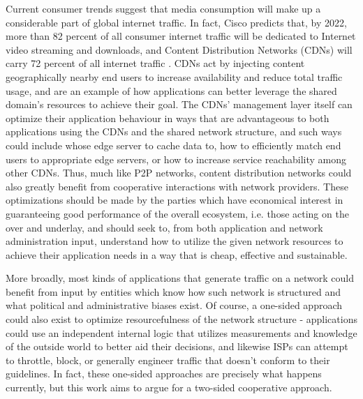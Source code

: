     Current consumer trends suggest that media consumption will make up a considerable part of global internet traffic.
    In fact, Cisco predicts that, by 2022, more than 82 percent of all consumer internet traffic will be dedicated to Internet video streaming and downloads, and Content Distribution Networks (CDNs) will carry 72 percent of all internet traffic \cite{cisco2019} .
    CDNs act by injecting content geographically nearby end users to increase availability and reduce total traffic usage, and are an example of how applications can better leverage the shared domain's resources to achieve their goal.
    The CDNs' management layer itself can optimize their application behaviour in ways that are advantageous to both applications using the CDNs and the shared network structure, and such ways could include whose edge server to cache data to, how to efficiently match end users to appropriate edge servers, or how to increase service reachability among other CDNs.
    Thus, much like P2P networks, content distribution networks could also greatly benefit from cooperative interactions with network providers.
    These optimizations should be made by the parties which have economical interest in guaranteeing good performance of the overall ecosystem, i.e. those acting on the over and underlay, and should seek to, from both application and network administration input, understand how to utilize the given network resources to achieve their application needs in a way that is cheap, effective and sustainable.

    More broadly, most kinds of applications that generate traffic on a network could benefit from input by entities which know how such network is structured and what political and administrative biases exist.
    Of course, a one-sided approach could also exist to optimize resourcefulness of the network structure - applications could use an independent internal logic that utilizes measurements and knowledge of the outside world to better aid their decisions, and likewise ISPs can attempt to throttle, block, or generally engineer traffic that doesn't conform to their guidelines.
    In fact, these one-sided approaches are precisely what happens currently, but this work aims to argue for a two-sided cooperative approach.

